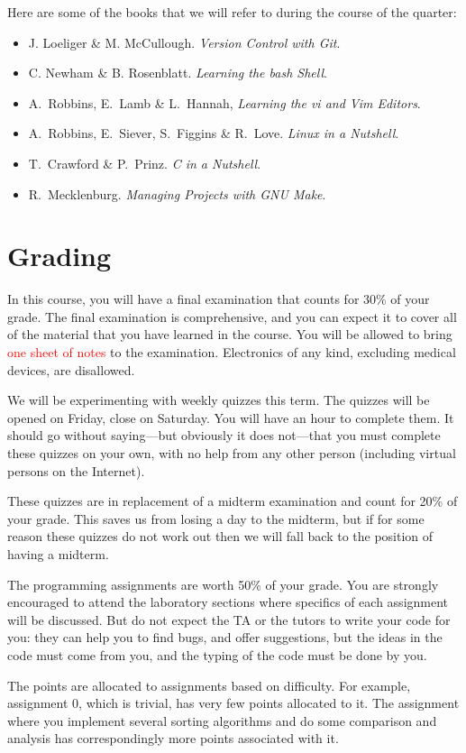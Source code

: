 \documentclass{article}
\begin{document}
Here are some of the books that we will refer to during the course of the
quarter:
\begin{itemize}
\item J.\xspace Loeliger \& M.\xspace McCullough. \emph{Version Control with Git}.
\item C.\xspace Newham \& B.\xspace Rosenblatt. \emph{Learning the bash Shell}.
\item A.\ Robbins, E.\ Lamb \& L.\ Hannah, \emph{Learning the vi and Vim Editors}.
\item A.\ Robbins, E.\ Siever, S.\ Figgins \& R.\ Love. \emph{Linux in a Nutshell}.
\item T.\ Crawford \& P.\ Prinz. \emph{C in a Nutshell}.
\item R.\  Mecklenburg. \emph{Managing Projects with GNU Make}.
\end{itemize}
\section{Grading}
In this course, you will have a final examination that counts for 30\% of your
grade. The final examination is comprehensive, and you can expect it to cover
all of the material that you have learned in the course. You will be allowed
to bring \textcolor{red}{one sheet of notes} to the examination. Electronics
of any kind, excluding medical devices, are disallowed.

We will be experimenting with weekly quizzes this term. The quizzes will be
opened on Friday, close on Saturday. You will have an hour to complete them.
It should go without saying---but obviously it does not---that you must
complete these quizzes on your own, with no help from any other person
(including virtual persons on the Internet).

These quizzes are in replacement of a midterm examination and count
for 20\% of your grade. This saves us from losing a day to the
midterm, but if for some reason these quizzes do not work out then
we will fall back to the position of having a midterm.

The programming assignments are worth 50\% of your grade. You are strongly
encouraged to attend the laboratory sections where specifics of each
assignment will be discussed. But do not expect the TA or the tutors to write
your code for you: they can help you to find bugs, and offer suggestions, but
the ideas in the code must come from you, and the typing of the code must be
done by you.

The points are allocated to assignments based on difficulty. For example,
assignment 0, which is trivial, has very few points allocated to it. The
assignment where you implement several sorting algorithms and do some
comparison and analysis has correspondingly more points associated with it.
\end{document}
